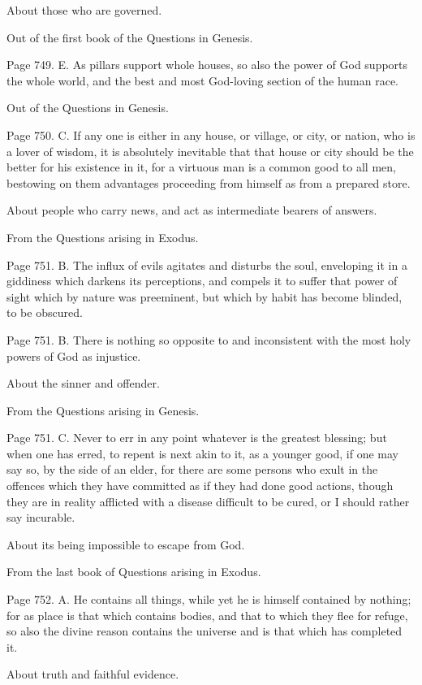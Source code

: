 About those who are governed.

Out of the first book of the Questions in Genesis.

Page 749. E. As pillars support whole houses, so also the power of God supports the whole world,
and the best and most God-loving section of the human race.

Out of the Questions in Genesis.

Page 750. C. If any one is either in any house, or village, or city, or nation, who is a lover of
wisdom, it is absolutely inevitable that that house or city should be the better for his existence in it,
for a virtuous man is a common good to all men, bestowing on them advantages proceeding from
himself as from a prepared store.

About people who carry news, and act as intermediate bearers of answers.

From the Questions arising in Exodus.

Page 751. B. The influx of evils agitates and disturbs the soul, enveloping it in a giddiness which
darkens its perceptions, and compels it to suffer that power of sight which by nature was
preeminent, but which by habit has become blinded, to be obscured.

Page 751. B. There is nothing so opposite to and inconsistent with the most holy powers of God as
injustice.

About the sinner and offender.

From the Questions arising in Genesis.

Page 751. C. Never to err in any point whatever is the greatest blessing; but when one has erred,
to repent is next akin to it, as a younger good, if one may say so, by the side of an elder, for there
are some persons who exult in the offences which they have committed as if they had done good
actions, though they are in reality afflicted with a disease difficult to be cured, or I should rather say
incurable.

About its being impossible to escape from God.

From the last book of Questions arising in Exodus.

Page 752. A. He contains all things, while yet he is himself contained by nothing; for as place is
that which contains bodies, and that to which they flee for refuge, so also the divine reason
contains the universe and is that which has completed it.

About truth and faithful evidence.

